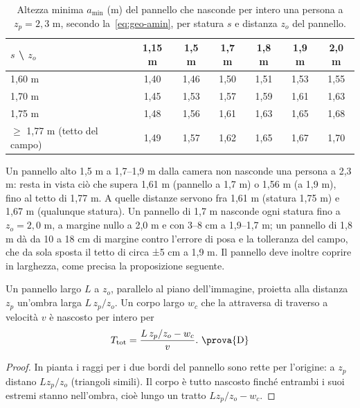\begin{table}[htb]\centering\small
\caption{Altezza minima $a_{\min}$ (m) del pannello che nasconde per intero una persona a $z_p=2{,}3$ m, secondo la~\eqref{eq:geo-amin}, per statura $s$ e distanza $z_o$ del pannello. }\label{tab:geo-amin}
\begin{tabular}{@{}lcccccc@{}}
\toprule
$s$ \textbackslash{} $z_o$ & 1,15 m & 1,5 m & 1,7 m & 1,8 m & 1,9 m & 2,0 m\\
\midrule
1,60 m & 1,40 & 1,46 & 1,50 & 1,51 & 1,53 & 1,55\\
1,70 m & 1,45 & 1,53 & 1,57 & 1,59 & 1,61 & 1,63\\
1,75 m & 1,48 & 1,56 & 1,61 & 1,63 & 1,65 & 1,68\\
$\ge$ 1,77 m (tetto del campo) & 1,49 & 1,57 & 1,62 & 1,65 & 1,67 & 1,70\\
\bottomrule
\end{tabular}
\end{table}

Un pannello alto 1,5 m a 1,7--1,9 m dalla camera non nasconde una persona a 2,3 m: resta in vista ciò che supera 1,61 m (pannello a 1,7 m) o 1,56 m (a 1,9 m), fino al tetto di 1,77 m. A quelle distanze servono fra 1,61 m (statura 1,75 m) e 1,67 m (qualunque statura). Un pannello di 1,7 m nasconde ogni statura fino a $z_o=2{,}0$ m, a margine nullo a 2,0 m e con 3--8 cm a 1,9--1,7 m; un pannello di 1,8 m dà da 10 a 18 cm di margine contro l'errore di posa e la tolleranza del campo, che da sola sposta il tetto di circa ±5 cm a 1,9 m. Il pannello deve inoltre coprire in larghezza, come precisa la proposizione seguente.

\begin{proposizione}\label{prop:geo-durata}
Un pannello largo $L$ a $z_o$, parallelo al piano dell'immagine, proietta alla distanza $z_p$ un'ombra larga $L\,z_p/z_o$. Un corpo largo $w_c$ che la attraversa di traverso a velocità $v$ è nascosto per intero per
\begin{equation}\label{eq:geo-durata}
T_{\mathrm{tot}}=\frac{L\,z_p/z_o-w_c}{v}.\ \text{\prova{D}}
\end{equation}
\end{proposizione}
\begin{proof}
In pianta i raggi per i due bordi del pannello sono rette per l'origine: a $z_p$ distano $L z_p/z_o$ (triangoli simili). Il corpo è tutto nascosto finché entrambi i suoi estremi stanno nell'ombra, cioè lungo un tratto $L z_p/z_o-w_c$.
\end{proof}

